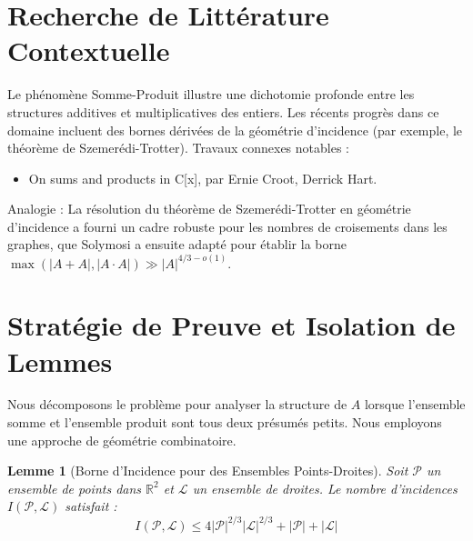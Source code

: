 \documentclass[12pt]{article}
\newtheorem{lemma}[theorem]{Lemme}
\begin{document}
\section{Recherche de Litt\'erature Contextuelle}
Le ph\'enom\`ene Somme-Produit illustre une dichotomie profonde entre les structures additives et multiplicatives des entiers. Les r\'ecents progr\`es dans ce domaine incluent des bornes d\'eriv\'ees de la g\'eom\'etrie d'incidence (par exemple, le th\'eor\`eme de Szemer\'edi-Trotter). Travaux connexes notables :
\begin{itemize}
\item On sums and products in C[x], par Ernie Croot, Derrick Hart.

\end{itemize}
Analogie : La r\'esolution du th\'eor\`eme de Szemer\'edi-Trotter en g\'eom\'etrie d'incidence a fourni un cadre robuste pour les nombres de croisements dans les graphes, que Solymosi a ensuite adapt\'e pour \'etablir la borne $\max(|A + A|, |A \cdot A|) \gg |A|^{4/3 - o(1)}$.

\section{Strat\'egie de Preuve et Isolation de Lemmes}
Nous d\'ecomposons le probl\`eme pour analyser la structure de $A$ lorsque l'ensemble somme et l'ensemble produit sont tous deux pr\'esum\'es petits. Nous employons une approche de g\'eom\'etrie combinatoire.

\begin{lemma}[Borne d'Incidence pour des Ensembles Points-Droites]
\label{lem:incidence}
Soit $\mathcal{P}$ un ensemble de points dans $\mathbb{R}^2$ et $\mathcal{L}$ un ensemble de droites. Le nombre d'incidences $I(\mathcal{P}, \mathcal{L})$ satisfait :
\[
I(\mathcal{P}, \mathcal{L}) \leq 4 |\mathcal{P}|^{2/3} |\mathcal{L}|^{2/3} + |\mathcal{P}| + |\mathcal{L}|
\]
\end{lemma}
\end{document}
